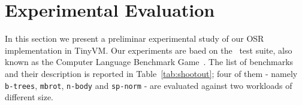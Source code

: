 
\section{Experimental Evaluation}
\label{se:experiments}

In this section we present a preliminar experimental study of our OSR implementation in TinyVM. Our experiments are baed on the \shootout\ test suite, also known as the Computer Language Benchmark Game~\cite{shootout}. %
The list of benchmarks and their description is reported in Table~\ref{tab:shootout}; four of them - namely {\tt b-trees}, {\tt mbrot}, {\tt n-body} and {\tt sp-norm} - are evaluated against two workloads of different size.

